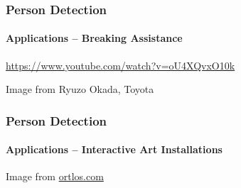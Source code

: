 \documentclass[xetex,professionalfont]{beamer}
\begin{document}
\begin{frame}
\frametitle{Person Detection}
\framesubtitle{Applications -- Breaking Assistance}

\begin{center}
	\url{https://www.youtube.com/watch?v=oU4XQvxO10k} %
\end{center}

\begin{center}
    {\centering Image from Ryuzo Okada, Toyota}
\end{center}

\end{frame}


\begin{frame}
\frametitle{Person Detection}
\framesubtitle{Applications -- Interactive Art Installations}

\begin{center}
    {\centering Image from \url{ortlos.com}}
\end{center}

\end{frame}

\end{document}
